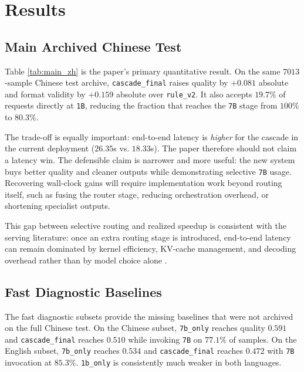 \documentclass{article}
\newcommand{\tighttable}[1]{%
  \begingroup
  \setlength{\tabcolsep}{5pt}%
  \renewcommand{\arraystretch}{1.12}%
  #1%
  \endgroup
}
\begin{document}
\section{Results}
\subsection{Main Archived Chinese Test}
Table \ref{tab:main_zh} is the paper's primary quantitative result. On the same \(7013\)-sample Chinese test archive, \texttt{cascade\_final} raises quality by \(+0.081\) absolute and format validity by \(+0.159\) absolute over \texttt{rule\_v2}. It also accepts \(19.7\%\) of requests directly at \texttt{1B}, reducing the fraction that reaches the \texttt{7B} stage from \(100\%\) to \(80.3\%\).

The trade-off is equally important: end-to-end latency is \emph{higher} for the cascade in the current deployment (\(26.35\)s vs. \(18.33\)s). The paper therefore should not claim a latency win. The defensible claim is narrower and more useful: the new system buys better quality and cleaner outputs while demonstrating selective \texttt{7B} usage. Recovering wall-clock gains will require implementation work beyond routing itself, such as fusing the router stage, reducing orchestration overhead, or shortening specialist outputs.

This gap between selective routing and realized speedup is consistent with the serving literature: once an extra routing stage is introduced, end-to-end latency can remain dominated by kernel efficiency, KV-cache management, and decoding overhead rather than by model choice alone \cite{flashattention, pagedattention, speculative_decoding, medusa, eagle}.

\begin{table}[H]
\centering
\caption{Full Chinese test results after rescoring saved predictions.}
\label{tab:main_zh}
\small
\tighttable{}
\end{table}
\FloatBarrier

\subsection{Fast Diagnostic Baselines}
The fast diagnostic subsets provide the missing baselines that were not archived on the full Chinese test. On the Chinese subset, \texttt{7b\_only} reaches quality \(0.591\) and \texttt{cascade\_final} reaches \(0.510\) while invoking \texttt{7B} on \(77.1\%\) of samples. On the English subset, \texttt{7b\_only} reaches \(0.534\) and \texttt{cascade\_final} reaches \(0.472\) with \texttt{7B} invocation at \(85.3\%\). \texttt{1b\_only} is consistently much weaker in both languages.
\end{document}
